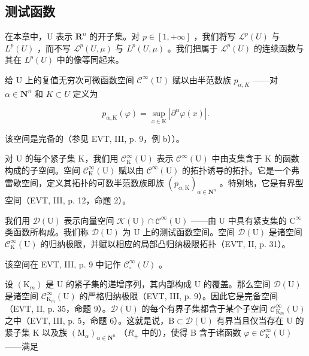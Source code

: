 \subsection{测试函数}

在本章中，U 表示 \(\mathbf{R}^{n}\) 的开子集。对 \(p \in [1, +\infty]\) ，我们将写 \(\mathcal{L}^{p}(U)\) 与 \(L^{p}(U)\) ，而不写 \(\mathcal{L}^{p}(U, \mu)\) 与 \(L^{p}(U, \mu)\) 。我们把属于 \(\mathcal{L}^{p}(U)\) 的连续函数与其在 \(L^{p}(U)\) 中的像等同起来。

给 U 上的复值无穷次可微函数空间 \(\mathcal{C}^{\infty}(\mathrm{U})\) 赋以由半范数族 \(p_{\alpha,K}\) ——对 \(\alpha \in \mathbf{N}^{n}\) 和 \(K \subset U\) 定义为

\[
p _ {\alpha , \mathrm{K}} (\varphi) = \sup _ {x \in \mathrm{K}} | \partial^ {\alpha} \varphi (x) |.
\]

该空间是完备的（参见 EVT, III, p. 9，例 b））。

对 U 的每个紧子集 K，我们用 \(\mathcal{C}_{\mathrm{K}}^{\infty}(\mathrm{U})\) 表示 \(\mathcal{C}^{\infty}(\mathrm{U})\) 中由支集含于 K 的函数构成的子空间。空间 \(\mathcal{C}_{\mathrm{K}}^{\infty}(\mathrm{U})\) 赋以由 \(\mathcal{C}^{\infty}(\mathrm{U})\) 的拓扑诱导的拓扑。它是一个弗雷歇空间，定义其拓扑的可数半范数族即族 \((p_{\alpha,\mathrm{K}})_{\alpha\in\mathbf{N}^{n}}\) 。特别地，它是有界型空间（EVT, III, p. 12，命题 2）。

我们用 \(\mathcal{D}(\mathrm{U})\) 表示向量空间 \(\mathcal{K}(\mathrm{U})\cap \mathcal{C}^{\infty}(\mathrm{U})\) ——由 U 中具有紧支集的 \(\mathrm{C}^{\infty}\) 类函数所构成。我们称 \(\mathcal{D}(\mathrm{U})\) 为 U 上的测试函数空间。空间 \(\mathcal{D}(\mathrm{U})\) 是诸空间 \(\mathcal{C}_{\mathrm{K}}^{\infty}(\mathrm{U})\) 的归纳极限，并赋以相应的局部凸归纳极限拓扑（EVT, II, p. 31）。

该空间在 EVT, III, p. 9 中记作 \(\mathcal{C}_{\circ}^{\infty}(U)\) 。

设 \((\mathrm{K}_{m})\) 是 U 的紧子集的递增序列，其内部构成 U 的覆盖。那么空间 \(\mathcal{D}(\mathrm{U})\) 是诸空间 \(\mathcal{C}_{\mathrm{K}_{m}}^{\infty}(\mathrm{U})\) 的严格归纳极限（EVT, III, p. 9）。因此它是完备空间（EVT, II, p. 35，命题 9）。\(\mathcal{D}(\mathrm{U})\) 的每个有界子集都含于某个子空间 \(\mathcal{C}_{\mathrm{K}_{m}}^{\infty}(\mathrm{U})\) 之中（EVT, III, p. 5，命题 6）。这就是说，\(\mathrm{B}\subset\mathcal{D}(\mathrm{U})\) 有界当且仅当存在 U 的紧子集 K 以及族 \((\mathrm{M}_{\alpha})_{\alpha\in\mathbf{N}^{n}}\) （\(R_{+}\) 中的），使得 B 含于诸函数 \(\varphi\in\mathcal{C}_{\mathrm{K}}^{\infty}(\mathrm{U})\) ——满足

